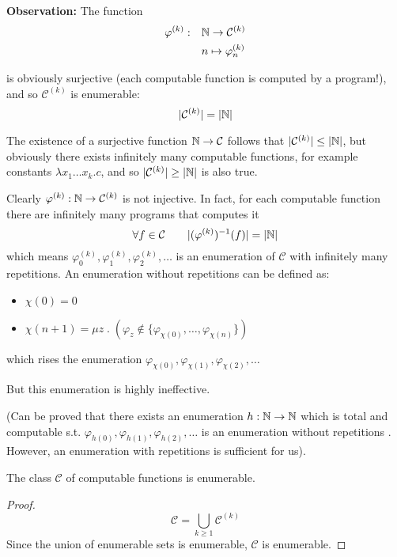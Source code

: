 \textbf{Observation:} The function \[
  \begin{split}
    \varphi^{(k)} : & \quad \mathbb{N} \rightarrow \mathcal{C}^{(k)} \\
    & \quad n \mapsto \varphi_n^{(k)}
  \end{split}
\]

is obviously surjective (each computable function is computed by a
program!), and so $\mathcal{C}^{(k)}$ is enumerable:
\[|\mathcal{C}^{(k)}| = |\mathbb{N}|\]

The existence of a surjective function $\mathbb{N} \rightarrow \mathcal{C}$
follows that $|\mathcal{C}^{(k)}| \leq |\mathbb{N}|$, but obviously there
exists infinitely many computable functions, for example constants
$\lambda x_1 \dots x_k . c$, and so $|\mathcal{C}^{(k)}| \geq |\mathbb{N}|$
is also true.

Clearly $\varphi^{(k)} : \mathbb{N} \rightarrow \mathcal{C}^{(k)}$ is not
injective. In fact, for each computable function there are infinitely
many programs that computes it
\[\forall f \in \mathcal{C} \quad \quad |(\varphi^{(k)})^{-1}(f)| =
  |\mathbb{N}|\] which means
\(\varphi_0^{(k)}, \varphi_1^{(k)}, \varphi_2^{(k)}, \dots\) is an
enumeration of $\mathcal{C}$ with infinitely many repetitions. An
enumeration without repetitions can be defined as:
\begin{itemize}
\item[] $\chi(0) = 0$
\item[]
  $\chi(n+1) = \mu z \; . \; (\varphi_z \notin \{\varphi_{\chi(0)},
  \dots, \varphi_{\chi(n)}\})$
\end{itemize}
which rises the enumeration
$\varphi_{\chi(0)}, \varphi_{\chi(1)}, \varphi_{\chi(2)}, \dots$

But this enumeration is highly ineffective.

(Can be proved that there exists an enumeration
$h : \mathbb{N} \rightarrow \mathbb{N}$ which is total and computable s.t.
$\varphi_{h(0)}, \varphi_{h(1)}, \varphi_{h(2)}, \dots$ is an
enumeration without repetitions \cite{firedberg:1958}. However, an
enumeration with repetitions is sufficient for us).

\begin{theorem}[$|\mathcal{C}| = |\nat|$]
  The class $\mathcal{C}$ of computable functions is enumerable.
  \begin{proof}
    \[ \mathcal{C} = \bigcup_{k \geq 1}\mathcal{C}^{(k)} \] Since the
    union of enumerable sets is enumerable, $\mathcal{C}$ is
    enumerable.
  \end{proof}
\end{theorem}


